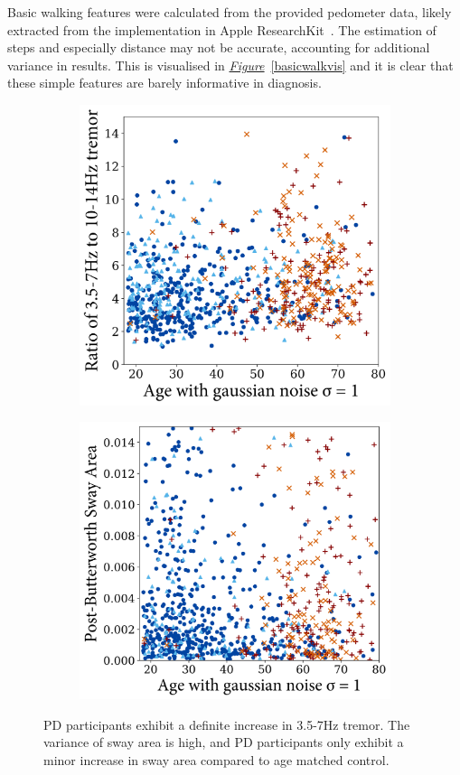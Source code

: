 \documentclass[12pt, twoside]{book}
\begin{document}
Basic walking features were calculated from the provided pedometer data, likely extracted from the implementation in Apple ResearchKit~\cite{mpower}. The estimation of steps and especially distance may not be accurate, accounting for additional variance in results. This is visualised in \textit{\hyperref[basicwalkvis]{Figure}}~\ref{basicwalkvis} and it is clear that these simple features are barely informative in diagnosis.


\begin{figure}[!htb]
	\centering
	\begin{subfigure}{.5\textwidth}
		\centering
		\includegraphics[width=0.92\linewidth]{resttremor.png}
	\end{subfigure}%
	\begin{subfigure}{.5\textwidth}
		\centering
		\includegraphics[width=0.92\linewidth]{bwswayarea.png}
	\end{subfigure}
	\caption{PD participants exhibit a definite increase in 3.5-7Hz tremor. The variance of sway area is high, and PD participants only exhibit a minor increase in sway area compared to age matched control. }
	\label{basicrest}
\end{figure}
\end{document}
